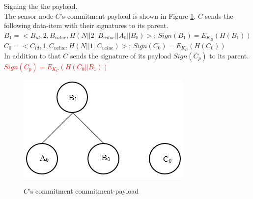 		\begin{exmp}
		Signing the the payload.\\	
		The sensor node $C$'s commitment payload is shown in Figure \ref{fig:Commitment payload of C}.
		$C$ sends the following data-item with their signatures to its parent.\\
		$B_{1} = <B_{id}, 2, B_{value}, H(N||2||B_{value}||A_{0}||B_{0})>$; $Sign(B_{1}) = E_{K_{B}}(H(B_{1}))$\\
		$C_{0} = <C_{id}, 1, C_{value}, H(N||1||C_{value})>$; $Sign(C_{0}) = E_{K_{C}}(H(C_{0}))$\\
		In addition to that $C$ sends the signature of its payload $Sign(C_{p})$ to its parent.\\
		\textcolor{red}{$Sign(C_{p}) = E_{K_{C}}(H(C_{0} || B_{1}))$}

			\begin{figure}[hp]
				\centering
				\includegraphics[scale = 1]{images/commitment-payload-of-C.png}\\
				\caption{$C$'s commitment commitment-payload}
				\label{fig:Commitment payload of C}
			\end{figure}
		\end{exmp}

